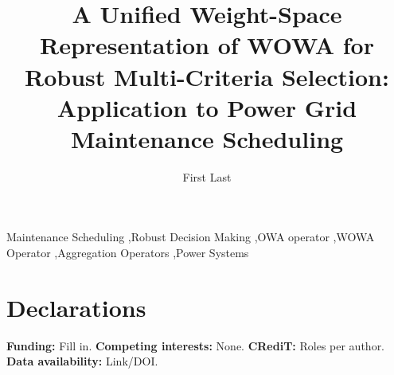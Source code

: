 \documentclass[review]{elsarticle}
\begin{document}
\begin{frontmatter}
\title{A Unified Weight-Space Representation of WOWA for Robust Multi-Criteria Selection: Application to Power Grid Maintenance Scheduling}

\author[aff1]{First Last}
\address[aff1]{Department, University, City, Country}

\begin{abstract}

\end{abstract}

\begin{keyword}
Maintenance Scheduling \sep Robust Decision Making \sep OWA operator \sep WOWA Operator \sep Aggregation Operators \sep Power Systems
\end{keyword}
\end{frontmatter}













\section*{Declarations}
\textbf{Funding:} Fill in.\quad
\textbf{Competing interests:} None.\quad
\textbf{CRediT:} Roles per author.\quad
\textbf{Data availability:} Link/DOI.



\end{document}
